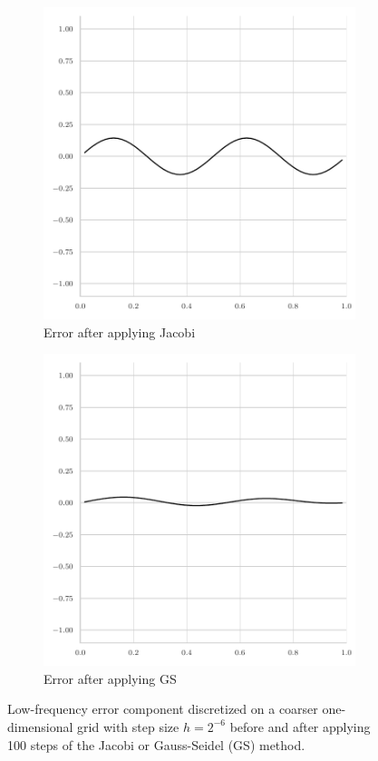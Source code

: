 \begin{figure}
\begin{subfigure}[t]{0.32\textwidth}
	\includegraphics[width=\textwidth]{figures/error_plots//final_error_jacobi_4pi_coarse.pdf}
	\caption{Error after applying Jacobi}
\end{subfigure}
	\hfill
	\begin{subfigure}[t]{0.32\textwidth}
		\centering
		\includegraphics[width=\textwidth]{figures/error_plots//final_error_gauss_seidel_4pi_coarse.pdf}
		\caption{Error after applying GS}
	\end{subfigure}
	\caption{Low-frequency error component discretized on a coarser one-dimensional grid with step size $h = 2^{-6}$ before and after applying 100 steps of the Jacobi or Gauss-Seidel (GS) method.}
	\label{fig:low-frequency-error-component-coarse}
\end{figure}
